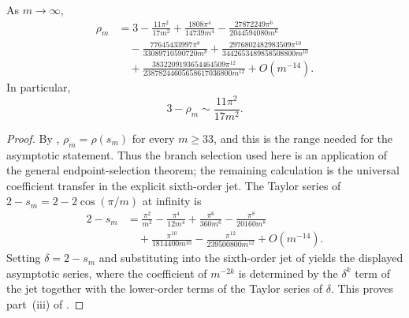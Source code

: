\begin{theorem}
  \label{thm:rho-gap-m12}
  As \(m\to\infty\),
  \begin{align*}
    \rho_m
    &=3-\frac{11\pi^2}{17m^2}
      +\frac{1808\pi^4}{14739m^4}
      -\frac{27872249\pi^6}{2044594080m^6} \\
    &\quad
      -\frac{77645433997\pi^8}{33089710590720m^8}
      +\frac{2976802482983509\pi^{10}}
             {3442653489858508800m^{10}} \\
    &\quad
      +\frac{3832209193654464509\pi^{12}}
             {23878244605658617036800m^{12}}
      +O(m^{-14}).
  \end{align*}
  In particular,
  \[
    3-\rho_m\sim \frac{11\pi^2}{17m^2}.
  \]
\end{theorem}

\begin{proof}
By ,
\(\rho_m=\rho(s_m)\) for every \(m\ge33\), and this is the range needed
for the asymptotic statement. Thus the branch selection used here is an
application of the general endpoint-selection theorem; the remaining
calculation is the universal coefficient transfer in the explicit
sixth-order jet.
The Taylor series of \(2-s_m=2-2\cos(\pi/m)\) at infinity is
\[
\begin{aligned}
  2-s_m
  &=\frac{\pi^2}{m^2}-\frac{\pi^4}{12m^4}
    +\frac{\pi^6}{360m^6}-\frac{\pi^8}{20160m^8} \\
  &\quad
    +\frac{\pi^{10}}{1814400m^{10}}
    -\frac{\pi^{12}}{239500800m^{12}}+O(m^{-14}).
\end{aligned}
\]
Setting \(\delta=2-s_m\) and substituting into the sixth-order jet of
 yields the displayed asymptotic series,
where the coefficient of \(m^{-2k}\) is determined by the \(\delta^k\)
term of the jet together with the lower-order terms of the Taylor series
of \(\delta\). This proves part~\textup{(iii)} of
.
\end{proof}

